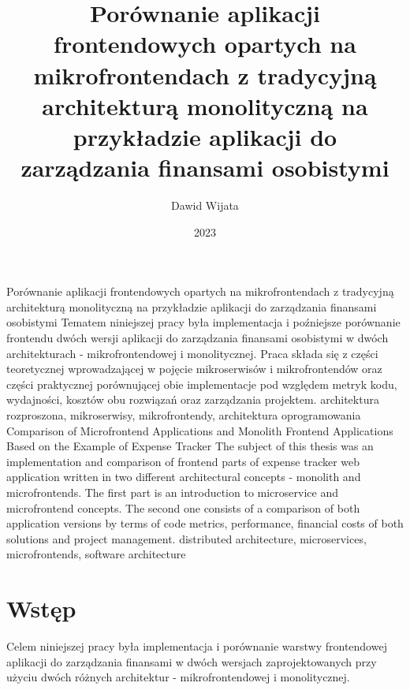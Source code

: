 \documentclass{SGGW-thesis}
\title{Porównanie aplikacji frontendowych opartych na mikrofrontendach z tradycyjną architekturą monolityczną na przykładzie aplikacji do zarządzania finansami osobistymi}
\author{Dawid Wijata}
\date{2023}
\begin{document}

\makeatother

\maketitle
\statementpage
\abstractpage
{Porównanie aplikacji frontendowych opartych na mikrofrontendach z tradycyjną architekturą monolityczną na przykładzie aplikacji do zarządzania finansami osobistymi}
{Tematem niniejszej pracy była implementacja i poźniejsze porównanie frontendu dwóch wersji aplikacji do zarządzania finansami osobistymi w dwóch architekturach - mikrofrontendowej i monolitycznej. Praca składa się z części teoretycznej wprowadzającej w pojęcie mikroserwisów i mikrofrontendów oraz części praktycznej porównującej obie implementacje pod względem metryk kodu, wydajności, kosztów obu rozwiązań oraz zarządzania projektem.}
{architektura rozproszona, mikroserwisy, mikrofrontendy, architektura oprogramowania}
{Comparison of Microfrontend Applications and Monolith Frontend Applications Based on the Example of Expense Tracker}
{The subject of this thesis was an implementation and comparison of frontend parts of expense tracker web application written in two different architectural concepts - monolith and microfrontends. The first part is an introduction to microservice and microfrontend concepts. The second one consists of a comparison of both application versions by terms of code metrics, performance, financial costs of both solutions and project management.}
{distributed architecture, microservices, microfrontends, software architecture}

{
	\doublespacing
	\tableofcontents
}

\startchapterfromoddpage %

\chapter{Wstęp}
Celem niniejszej pracy była implementacja i porównanie warstwy frontendowej aplikacji do zarządzania finansami w dwóch wersjach zaprojektowanych przy użyciu dwóch różnych architektur - mikrofrontendowej i monolitycznej.
\end{document}
